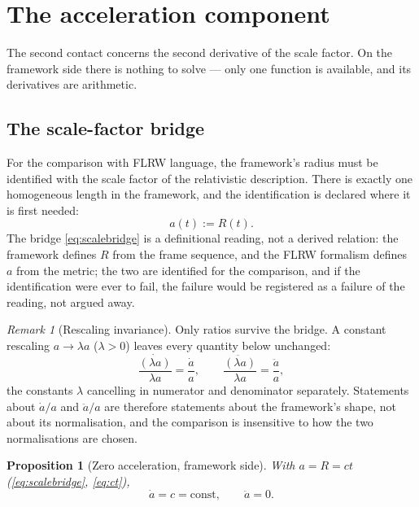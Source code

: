 \documentclass[11pt]{amsbook}
\theoremstyle{plain}
\newtheorem{proposition}[theorem]{Proposition}
\theoremstyle{definition}
\theoremstyle{remark}
\newtheorem{remark}[theorem]{Remark}
\newcommand{\uses}[1]{\par\nopagebreak\noindent{\footnotesize\emph{Uses: #1.}\par}}
\begin{document}
\section{The acceleration component}\label{sec:acceleration-component}

The second contact concerns the second derivative of the scale factor. On the framework side there is nothing to solve --- only one function is available, and its derivatives are arithmetic.

\subsection{The scale-factor bridge}\label{sec:bridge}

For the comparison with FLRW language, the framework's radius must be identified with the scale factor of the relativistic description. There is exactly one homogeneous length in the framework, and the identification is declared where it is first needed:
\begin{equation}\label{eq:scalebridge}
a(t) := R(t).
\end{equation}
The bridge \cref{eq:scalebridge} is a definitional reading, not a derived relation: the framework defines $R$ from the frame sequence, and the FLRW formalism defines $a$ from the metric; the two are identified for the comparison, and if the identification were ever to fail, the failure would be registered as a failure of the reading, not argued away.

\begin{remark}[Rescaling invariance]\label{rem:rescale}
Only ratios survive the bridge. A constant rescaling $a \to \lambda a$ ($\lambda > 0$) leaves every quantity below unchanged:
\begin{equation}\label{eq:rescale}
\frac{\dot{(\lambda a)}}{\lambda a} = \frac{\dot a}{a},
\qquad
\frac{\ddot{(\lambda a)}}{\lambda a} = \frac{\ddot a}{a},
\end{equation}
the constants $\lambda$ cancelling in numerator and denominator separately. Statements about $\dot a/a$ and $\ddot a/a$ are therefore statements about the framework's shape, not about its normalisation, and the comparison is insensitive to how the two normalisations are chosen.
\end{remark}

\begin{proposition}[Zero acceleration, framework side]\label{prop:zero-accel}
With $a = R = ct$ (\cref{eq:scalebridge}, \cref{eq:ct}),
\begin{equation}\label{eq:zero-accel}
\dot a = c = \text{const}, \qquad \ddot a = 0.
\end{equation}
\uses{\cref{eq:ct}, \cref{eq:scalebridge}}
\end{proposition}
\end{document}
